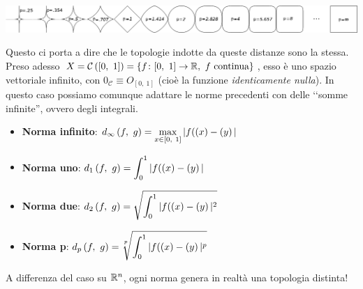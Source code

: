 \begin{center}
	\hspace*{-12cm}\begin{minipage}{.2\linewidth}
		\includegraphics[trim=18.1cm 0cm 0cm 0cm,clip,scale=0.37]{images/pnorm.png}
	\end{minipage}
\end{center}
Questo ci porta a dire che le topologie indotte da queste distanze sono la stessa.\\
Preso adesso $X=\mathcal{C}\left([0,\ 1]\right)=\left\{\funz{f}{[0,\ 1]}{\realset},\ f\text{ continua}\right\}$, esso è uno spazio vettoriale infinito, con $0_\mathcal{C}\equiv O_{[0,\ 1]}$ (cioè la funzione \textit{identicamente nulla}). In questo caso possiamo comunque adattare le norme precedenti con delle ‘‘somme infinite'', ovvero degli integrali.
\begin{itemize}
	\item \textbf{Norma infinito}: $\displaystyle\mvf{d_\infty}{f}{g}=\max_{x\in[0,\ 1]}{|f(\left(x\right)-\left(y\right)|}$
	\item \textbf{Norma uno}: $\displaystyle d_1\left(f,\ g\right)=\int_{0}^{1}|f(\left(x\right)-\left(y\right)|$
	\item \textbf{Norma due}: $\displaystyle d_2\left(f,\ g\right)=\sqrt{\int_{0}^{1}|f(\left(x\right)-\left(y\right)|^2}$
	\item \textbf{Norma p}: $\displaystyle\mvf{d_p}{f}{g}=\sqrt[\leftroot{1}\uproot{3}p]{\int_{0}^{1}|f(\left(x\right)-\left(y\right)|^p}$
\end{itemize}
A differenza del caso su $\mathbb{R}^n$, ogni norma genera in realtà una topologia distinta!
